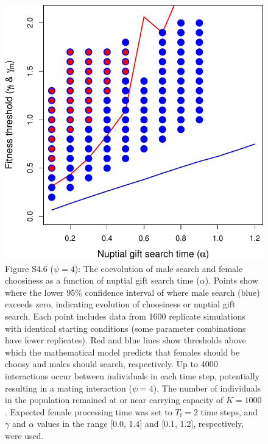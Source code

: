 \documentclass[
]{article}
\begin{document}
\captionsetup{labelformat=default}

\clearpage

\captionsetup{labelformat=empty}

\begin{figure}
\centering
\includegraphics{ms_refs_fixed_files/figure-latex/unnamed-chunk-11-1.pdf}
\caption{Figure S4.6 (\(\psi = 4\)): The coevolution of male search and
female choosiness as a function of nuptial gift search time
(\(\alpha\)). Points show where the lower 95\% confidence interval of
where male search (blue) exceeds zero, indicating evolution of
choosiness or nuptial gift search. Each point includes data from 1600
replicate simulations with identical starting conditions (some parameter
combinations have fewer replicates). Red and blue lines show thresholds
above which the mathematical model predicts that females should be
choosy and males should search, respectively. Up to 4000 interactions
occur between individuals in each time step, potentially resulting in a
mating interaction (\(\psi = 4\)). The number of individuals in the
population remained at or near carrying capacity of \(K = 1000\).
Expected female processing time was set to \(T_{\mathrm{f}}=2\) time
steps, and \(\gamma\) and \(\alpha\) values in the range {[}0.0, 1.4{]}
and {[}0.1, 1.2{]}, respectively, were used.}
\end{figure}
\end{document}
